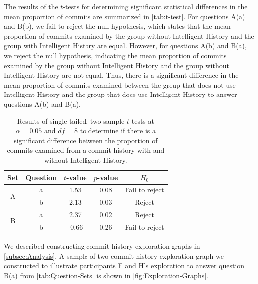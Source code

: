 The results of the $t$-tests for determining significant statistical differences in the mean proportion of commits are summarized in \autoref{tab:t-test}.
For questions A(a) and B(b), we fail to reject the null hypothesis, which states that the mean proportion of commits examined by the group without Intelligent History and the group with Intelligent History are equal.
However, for questions A(b) and B(a), we reject the null hypothesis, indicating the mean proportion of commits examined by the group without Intelligent History and the group without Intelligent History are not equal.
Thus, there is a significant difference in the mean proportion of commits examined between the group that does not use Intelligent History and the group that does use Intelligent History to answer questions A(b) and B(a).

\begin{table}[h]
  \caption{
    Results of single-tailed, two-sample $t$-tests at $\alpha = 0.05$ and $df = 8$ to determine if there is a significant difference between the proportion of commits examined from a commit history
    with and without Intelligent History.
  }
  \centering
  \begin{tabular}{@{}ccccc@{}}
    \toprule
    Set                                     & Question               & \multicolumn{1}{c}{$t$-value} & \multicolumn{1}{c}{$p$-value} & $H_{0}$ \\ \midrule
    \multicolumn{1}{c|}{\multirow{2}{*}{A}} & \multicolumn{1}{c|}{a} & 1.53                        & 0.08                        & Fail to reject   \\ \cmidrule(l){2-5} 
    \multicolumn{1}{c|}{}                   & \multicolumn{1}{c|}{b} & 2.13                        & 0.03                        & Reject   \\ \midrule
    \multicolumn{1}{c|}{\multirow{2}{*}{B}} & \multicolumn{1}{c|}{a} & 2.37                        & 0.02                        & Reject   \\ \cmidrule(l){2-5} 
    \multicolumn{1}{c|}{}                   & \multicolumn{1}{c|}{b} & -0.66                       & 0.26                        & Fail to reject   \\ \bottomrule
  \end{tabular}
  \label{tab:t-test}
\end{table}

We described constructing commit history exploration graphs in \autoref{subsec:Analysis}. 
A sample of two commit history exploration graph we constructed to illustrate participants F and H’s exploration to answer question B(a) from \autoref{tab:Question-Sets} is shown in \autoref{fig:Exploration-Graphs}.

